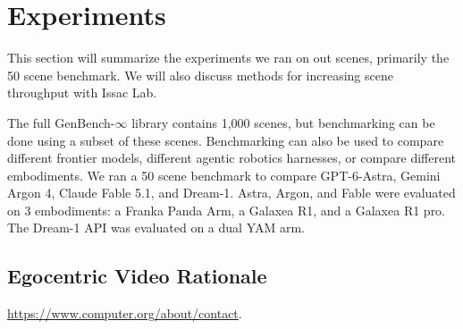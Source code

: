\section{Experiments}
\label{sec:Experiments}
This section will summarize the experiments we ran on out scenes, primarily the 50 scene benchmark. We will also discuss methods for increasing scene throughput with Issac Lab.

The full GenBench-$\infty$ library contains 1,000 scenes, but benchmarking can be done using a subset of these scenes. Benchmarking can also be used to compare different frontier models, different agentic robotics harnesses, or compare different embodiments. We ran a 50 scene benchmark to compare GPT-6-Astra, Gemini Argon 4, Claude Fable 5.1, and Dream-1. Astra, Argon, and Fable were evaluated on 3 embodiments: a Franka Panda Arm, a  Galaxea R1, and a  Galaxea R1 pro. The Dream-1 API was evaluated on a dual YAM arm. 

\subsection{Egocentric Video Rationale}


\url{https://www.computer.org/about/contact}.